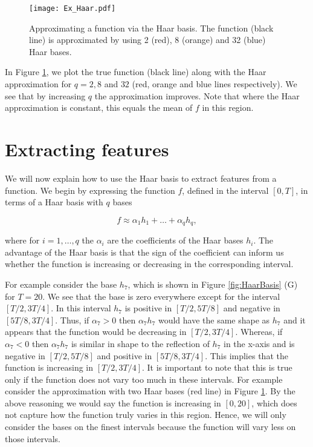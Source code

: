 \documentclass[12pt]{book} %
\begin{document}
     \begin{figure}[b!]
   \hrulefill
   \begin{center} 
    {\texttt{[image: Ex\_Haar.pdf]} }
    \end{center}     
    \caption{Approximating a function via the Haar basis. The function (black line) is approximated by using 2 (red), 8 (orange) and 32 (blue) Haar bases.}
    \label{fig:HaarApprox}
    \hrulefill
    \end{figure}
 
 In Figure \ref{fig:HaarApprox}, we plot the true function (black line) along with the Haar approximation for $q = 2,8$ and $32$ (red, orange and blue lines respectively). We see that by increasing $q$ the approximation improves. Note that where the Haar approximation is constant, this equals the mean of $f$ in this region.

\section{Extracting features}
We will now explain how to use the Haar basis to extract features from a function. We begin by expressing the function $f$, defined in the interval $[0,T]$, in terms of a Haar basis with $q$ bases

$$
f \approx \alpha_1 h_1 + \dots + \alpha_{q} h_q, 
$$

where for $i = 1, \dots , q$ the $\alpha_i$ are the coefficients of the Haar bases $h_i$. The advantage of the Haar basis is that the sign of the coefficient can inform us whether the function is increasing or decreasing in the corresponding interval.

For example consider the base $h_7$, which is shown in  Figure \ref{fig:HaarBasis} (G) for $T=20$. We see that the base is zero everywhere except for the interval $[T/2, 3T/4]$. In this interval $h_{7}$ is positive in $[T/2, 5T/8]$ and negative in $[5T/8, 3T/4]$. Thus, if $\alpha_7 >0$ then $\alpha_7 h_7$ would have the same shape as $h_7$ and it appears that the function would be decreasing in $[T/2, 3T/4]$. Whereas, if $\alpha_7 < 0$ then $\alpha_7 h_7$ is similar in shape to the reflection of $h_7$ in the x-axis and is negative in $[T/2, 5T/8]$ and positive in $[5T/8, 3T/4]$. This implies that the function is increasing in $[T/2, 3T/4]$. It is important to note that this is true only if the function does not vary too much in these intervals. For example consider the approximation with two Haar bases (red line) in Figure \ref{fig:HaarApprox}. By the above reasoning we would say the function is increasing in $[0,20]$, which does not capture how the function truly varies in this region. Hence, we will only consider the bases on the finest intervals because the function will vary less on those intervals. 
\end{document}
